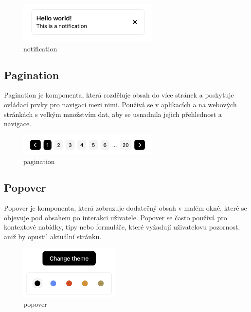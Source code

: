 \begin{figure}[H]
  \centering
  \includegraphics[width=7cm]{images/notification}
  \captionsetup{justification=centering,margin=2cm}
  \caption{notification} \label{picture:notification}
\end{figure}

\clearpage

\subsection{Pagination}
Pagination je komponenta, která rozděluje obsah do více stránek a poskytuje ovládací prvky pro navigaci mezi nimi. Používá se v aplikacích a na webových stránkách s velkým množstvím dat, aby se usnadnila jejich přehlednost a navigace.

\begin{figure}[H]
  \centering
  \includegraphics[width=7cm]{images/pagination}
  \captionsetup{justification=centering,margin=2cm}
  \caption{pagination} \label{picture:pagination}
\end{figure}

\subsection{Popover}
Popover je komponenta, která zobrazuje dodatečný obsah v malém okně, které se objevuje pod obsahem po interakci uživatele. Popover se často používá pro kontextové nabídky, tipy nebo formuláře, které vyžadují uživatelovu pozornost, aniž by opustil aktuální stránku.

\begin{figure}[H]
  \centering
  \includegraphics[width=5cm]{images/popover}
  \captionsetup{justification=centering,margin=2cm}
  \caption{popover} \label{picture:popover}
\end{figure}

